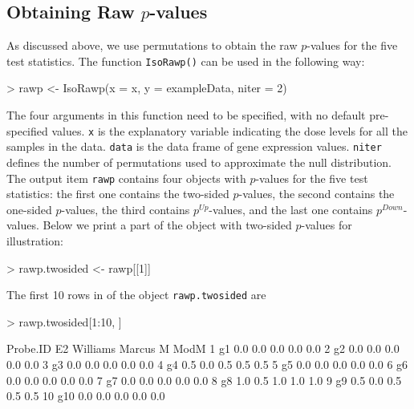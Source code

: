 \documentclass[10pt]{mybook4}
\begin{document}
\subsection{Obtaining Raw $p$-values}

As discussed above, we use permutations to obtain the raw $p$-values
for the five test statistics. The function \texttt{IsoRawp()} can be
used in the following way:

\begin{Schunk}
\begin{Sinput}
> rawp <- IsoRawp(x = x, y = exampleData, niter = 2)
\end{Sinput}
\end{Schunk}


The four arguments in this function need to be specified, with no
default pre-specified values. \texttt{x} is the explanatory variable
indicating the dose levels for all the samples in the data.
\texttt{data} is the data frame of gene expression values. %
\texttt{niter} defines the number of permutations used to
approximate the null distribution. The output item
\texttt{rawp} contains four objects with $p$-values for the five
test statistics: the first one contains the two-sided $p$-values,
the second contains the one-sided $p$-values, the third contains
$p^{Up}$-values, and the last one contains $p^{Down}$-values. Below
we print a part of the object with two-sided $p$-values for illustration:

\begin{Schunk}
\begin{Sinput}
> rawp.twosided <- rawp[[1]]
\end{Sinput}
\end{Schunk}


The first 10 rows in of the object \texttt{rawp.twosided} are
\begin{Schunk}
\begin{Sinput}
> rawp.twosided[1:10, ]
\end{Sinput}
\begin{Soutput}
   Probe.ID  E2 Williams Marcus   M ModM
1        g1 0.0      0.0    0.0 0.0  0.0
2        g2 0.0      0.0    0.0 0.0  0.0
3        g3 0.0      0.0    0.0 0.0  0.0
4        g4 0.5      0.0    0.5 0.5  0.5
5        g5 0.0      0.0    0.0 0.0  0.0
6        g6 0.0      0.0    0.0 0.0  0.0
7        g7 0.0      0.0    0.0 0.0  0.0
8        g8 1.0      0.5    1.0 1.0  1.0
9        g9 0.5      0.0    0.5 0.5  0.5
10      g10 0.0      0.0    0.0 0.0  0.0
\end{Soutput}
\end{Schunk}
\end{document}
